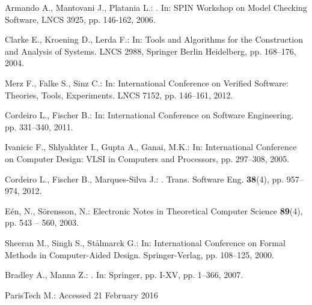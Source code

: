 \documentclass{acm_sen_article}
\begin{document}
{\begin{thebibliography}{1}
Armando A., Mantovani J., Platania L.:
. 
\newblock In: {SPIN} Workshop on Model Checking Software, LNCS 3925, pp. 146-162, 2006.

Clarke E., Kroening D., Lerda F.:
\newblock In: Tools and Algorithms for the Construction and Analysis of Systems. LNCS 2988, Springer Berlin Heidelberg, pp. 168--176, 2004.

Merz F., Falke S., Sinz C.:
\newblock In: International Conference on Verified Software: Theories, Tools, Experiments. LNCS 7152, pp. 146--161, 2012.

Cordeiro L., Fischer B.:
\newblock In: International Conference on Software Engineering. pp. 331--340, 2011.

Ivanicic F., Shlyakhter I., Gupta A., Ganai, M.K.:
\newblock In: International Conference on Computer Design: VLSI in Computers and Processors, pp. 297--308, 2005.

Cordeiro L., Fischer B., Marques{-}Silva J.:
.
 Trans. Software Eng. \textbf{38}(4), pp. 957--974, 2012.

E{\'{e}}n, N., S{\"{o}}rensson, N.:
\newblock Electronic Notes in Theoretical Computer Science \textbf{89}(4), pp. 543 -- 560, 2003.

Sheeran M., Singh S., St{\aa}lmarck G.:
\newblock In: International Conference on Formal Methods in Computer-Aided Design. Springer-Verlag, pp. 108--125, 2000.

Bradley A., Manna Z.:
. 
\newblock In: Springer, pp. I-XV, pp. 1--366, 2007.

ParisTech M.:
\newblock Accessed 21 February 2016


\end{thebibliography}}
\end{document}
